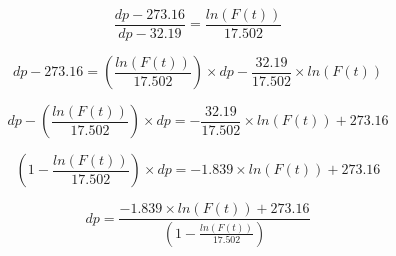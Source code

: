\documentclass[a4paper,11pt]{article}
\begin{document}
\begin{equation*}
 \frac{dp - 273.16}{dp-32.19} = \frac{ln \left( F(t) \right)}{17.502}   
\end{equation*}

\begin{equation*}
dp - 273.16 = \left(\frac{ln \left(  F(t) \right)}{17.502}   \right) \times dp - \frac{32.19}{17.502} \times ln \left(  F(t) \right)
\end{equation*} 

\begin{equation*}
dp - \left(\frac{ln \left(  F(t) \right)}{17.502}   \right) \times dp  = - \frac{32.19}{17.502} \times ln \left(  F(t) \right) + 273.16
\end{equation*} 


\begin{equation*}
\left (  1 - \frac{ ln \left(  F(t)  \right)}{17.502} \right) \times dp = - 1.839 \times ln \left(   F(t)    \right) + 273.16 
\end{equation*} 




\begin{equation}
dp =  \frac{ - 1.839 \times ln \left(   F(t)    \right) + 273.16 }{\left (  1 - \frac{ ln \left(  F(t)  \right)}{17.502} \right)}
\end{equation}






%
%
\end{document}

